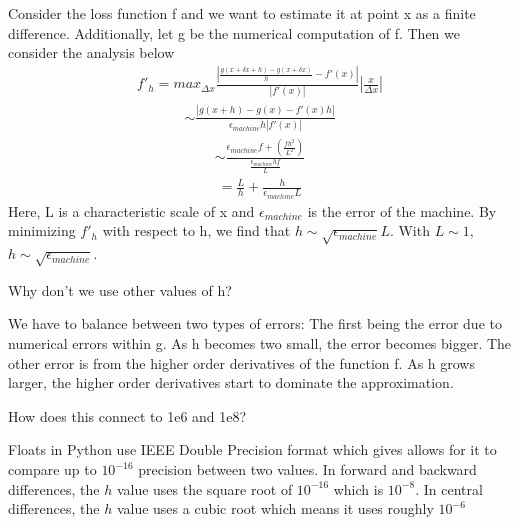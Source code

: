 \documentclass[letterpaper,10pt,english]{jupyterBook}
\begin{document}
\sphinxAtStartPar
Consider the loss function f and we want to estimate it at point x as a finite difference. Additionally, let g be the numerical computation of f. Then we consider the analysis below
\begin{equation*}
\begin{split}f'_h = max_{\Delta x} \frac{|\frac{g(x+\delta x + h) - g(x+\delta x)}{h} -f'(x)|}{|f'(x)|}|\frac{x}{\Delta x}|\end{split}
\end{equation*}\begin{equation*}
\begin{split}\sim \frac{|g(x+h) - g(x) -f'(x)h|}{\epsilon_{machine}h|f'(x)|}\end{split}
\end{equation*}\begin{equation*}
\begin{split}\sim\frac{\epsilon_{machine}f +(\frac{fh^2}{L^2})}{\frac{\epsilon_{machine}hf}{L}}\end{split}
\end{equation*}\begin{equation*}
\begin{split} = \frac{L}{h} + \frac{h}{\epsilon_{machine}L}\end{split}
\end{equation*}
\sphinxAtStartPar
Here, L is a characteristic scale of x and \(\epsilon_{machine}\) is the error of the machine. By minimizing \(f'_h\) with respect to h, we find that \(h \sim \sqrt{\epsilon_{machine}}L\). With \(L\sim 1\), \(h \sim \sqrt{\epsilon_{machine}}\).

\sphinxAtStartPar
Why don’t we use other values of h?

\sphinxAtStartPar
We have to balance between two types of errors: The first being the error due to numerical errors within g. As h becomes two small, the error becomes bigger. The other error is from the higher order derivatives of the function f. As h grows larger, the higher order derivatives start to dominate the approximation.

\sphinxAtStartPar
How does this connect to 1e\sphinxhyphen{}6 and 1e\sphinxhyphen{}8?

\sphinxAtStartPar
Floats in Python use IEEE Double Precision format which gives allows for it to compare up to \(10^{-16}\) precision between two values. In forward and backward differences, the \(h\) value uses the square root of \(10^{-16}\) which is \(10^{-8}\). In central differences, the \(h\) value uses a cubic root which means it uses roughly \(10^{-6}\)
\end{document}
